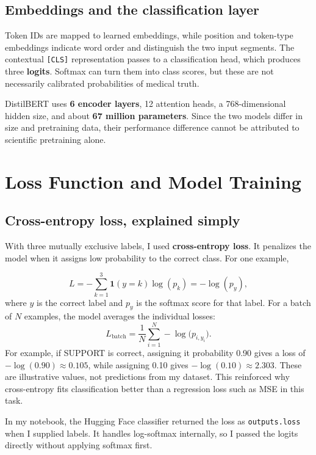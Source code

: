 \documentclass[11pt,letterpaper]{article}
\begin{document}
\subsection{Embeddings and the classification layer}
Token IDs are mapped to learned embeddings, while position and token-type embeddings indicate word order and distinguish the two input segments. The contextual \texttt{[CLS]} representation passes to a classification head, which produces three \textbf{logits}. Softmax can turn them into class scores, but these are not necessarily calibrated probabilities of medical truth.

DistilBERT uses \textbf{6 encoder layers}, 12 attention heads, a 768-dimensional hidden size, and about \textbf{67 million parameters}. Since the two models differ in size and pretraining data, their performance difference cannot be attributed to scientific pretraining alone.

\section{Loss Function and Model Training}
\subsection{Cross-entropy loss, explained simply}
With three mutually exclusive labels, I used \textbf{cross-entropy loss}. It penalizes the model when it assigns low probability to the correct class. For one example,

\begin{equation}
L=-\sum_{k=1}^{3}\mathbf{1}(y=k)\log(p_k)=-\log(p_y),
\end{equation}
where $y$ is the correct label and $p_y$ is the softmax score for that label. For a batch of $N$ examples, the model averages the individual losses:
\begin{equation}
L_{\mathrm{batch}}=\frac{1}{N}\sum_{i=1}^{N}-\log\bigl(p_{i,y_i}\bigr).
\end{equation}
For example, if SUPPORT is correct, assigning it probability 0.90 gives a loss of $-\log(0.90)\approx0.105$, while assigning 0.10 gives $-\log(0.10)\approx2.303$. These are illustrative values, not predictions from my dataset. This reinforced why cross-entropy fits classification better than a regression loss such as MSE in this task.

In my notebook, the Hugging Face classifier returned the loss as \texttt{outputs.loss} when I supplied labels. It handles log-softmax internally, so I passed the logits directly without applying softmax first.
\end{document}

